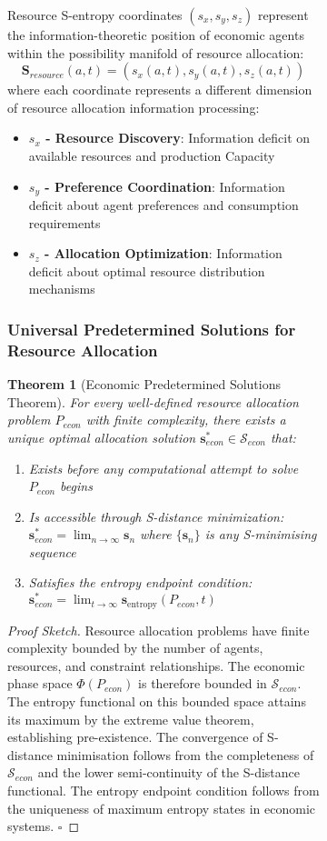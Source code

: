 \documentclass[12pt,a4paper]{article}
\newtheorem{theorem}{Theorem}
\begin{document}
\begin{figure}[H]
\begin{figure}[H]
Resource S-entropy coordinates $(s_x, s_y, s_z)$ represent the information-theoretic position of economic agents within the possibility manifold of resource allocation:
\begin{equation}
\mathbf{S}_{resource}(a,t) = (s_x(a,t), s_y(a,t), s_z(a,t))
\end{equation}
where each coordinate represents a different dimension of resource allocation information processing:
\begin{itemize}
\item \textbf{$s_x$ - Resource Discovery}: Information deficit on available resources and production Capacity
\item \textbf{$s_y$ - Preference Coordination}: Information deficit about agent preferences and consumption requirements  
\item \textbf{$s_z$ - Allocation Optimization}: Information deficit about optimal resource distribution mechanisms
\end{itemize}

\subsubsection{Universal Predetermined Solutions for Resource Allocation}

\begin{theorem}[Economic Predetermined Solutions Theorem]
For every well-defined resource allocation problem $P_{econ}$ with finite complexity, there exists a unique optimal allocation solution $\mathbf{s}^*_{econ} \in \mathcal{S}_{econ}$ that:
\begin{enumerate}
\item Exists before any computational attempt to solve $P_{econ}$ begins
\item Is accessible through S-distance minimization: $\mathbf{s}^*_{econ} = \lim_{n \to \infty} \mathbf{s}_n$ where $\{\mathbf{s}_n\}$ is any S-minimising sequence
\item Satisfies the entropy endpoint condition: $\mathbf{s}^*_{econ} = \lim_{t \to \infty} \mathbf{s}_{\text{entropy}}(P_{econ}, t)$
\end{enumerate}
\end{theorem}

\begin{proof}[Proof Sketch]
Resource allocation problems have finite complexity bounded by the number of agents, resources, and constraint relationships. The economic phase space $\Phi(P_{econ})$ is therefore bounded in $\mathcal{S}_{econ}$. The entropy functional on this bounded space attains its maximum by the extreme value theorem, establishing pre-existence. The convergence of S-distance minimisation follows from the completeness of $\mathcal{S}_{econ}$ and the lower semi-continuity of the S-distance functional. The entropy endpoint condition follows from the uniqueness of maximum entropy states in economic systems. $\square$
\end{proof}


\end{figure}
\end{figure}
\end{document}

